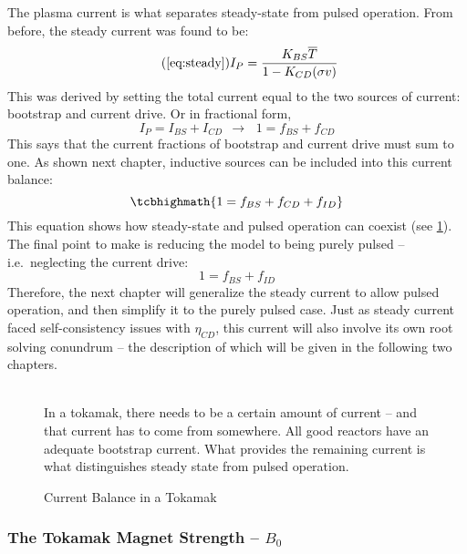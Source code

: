 The plasma current is what separates steady-state from pulsed operation. From before, the steady current was found to be:
\begin{equation}
	\tag{\ref{eq:steady}}
	I_P = \frac{K_{BS} \overline T}{1 - K_{CD} ( \sigma v ) }
\end{equation}
This was derived by setting the total current equal to the two sources of current: bootstrap and current drive. Or in fractional form,
\begin{equation}
	I_P = I_{BS} + I_{CD} \ \ \rightarrow \, \ \ 1 = f_{BS} + f_{CD}
\end{equation}
This says that the current fractions of bootstrap and current drive must sum to one. As shown next chapter, inductive sources can be included into this current balance:
\begin{equation}
	\label{eq:ifbal}
	\tcbhighmath{
	1 = f_{BS} + f_{CD} + f_{ID}
	}
\end{equation}
This equation shows how steady-state and pulsed operation can coexist (see \cref{fig:curbal}). The final point to make is reducing the model to being purely pulsed -- i.e.\ neglecting the current drive:
\begin{equation}
	1 = f_{BS} + f_{ID}
\end{equation}
Therefore, the next chapter will generalize the steady current to allow pulsed operation, and then simplify it to the purely pulsed case. Just as steady current faced self-consistency issues with $\eta_{CD}$, this current will also involve its own root solving conundrum -- the description of which will be given in the following two chapters.
\begin{figure}
	\centering
	\begin{adjustbox}{width=0.75\textwidth}
		
	\end{adjustbox}
	\caption{Current Balance in a Tokamak} ~\\
	\small In a tokamak, there needs to be a certain amount of current -- and that current has to come from somewhere. All good reactors have an adequate bootstrap current. What provides the remaining current is what distinguishes steady state from pulsed operation.
	\label{fig:curbal}
\end{figure}

\subsubsection{The Tokamak Magnet Strength -- $B_0$}

